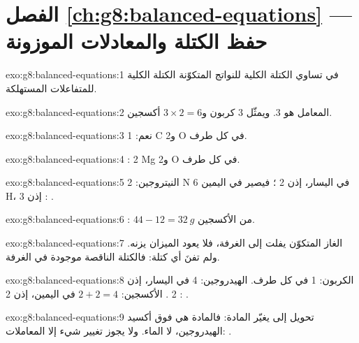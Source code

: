 \section*{الفصل \ref{ch:g8:balanced-equations} --- حفظ الكتلة والمعادلات الموزونة}

\begin{solution}{exo:g8:balanced-equations:1}
في  تساوي الكتلة الكلية للنواتج المتكوّنة الكتلة الكلية
للمتفاعلات المستهلكة.
\end{solution}

\begin{solution}{exo:g8:balanced-equations:2}
المعامل هو 3. ويمثّل 3  كربون و$3 \times 2 = 6$
 أكسجين.
\end{solution}

\begin{solution}{exo:g8:balanced-equations:3}
نعم: 1 C و2 O في كل طرف.
\end{solution}

\begin{solution}{exo:g8:balanced-equations:4}
: 2 Mg و2 O في كل طرف.
\end{solution}

\begin{solution}{exo:g8:balanced-equations:5}
النيتروجين: 2 N في اليسار، إذن 2 ؛ فيصير في اليمين 6 H، إذن 3
: .
\end{solution}

\begin{solution}{exo:g8:balanced-equations:6}
: $44 - 12 = \qty{32}{g}$ من الأكسجين.
\end{solution}

\begin{solution}{exo:g8:balanced-equations:7}
الغاز المتكوّن يفلت إلى الغرفة، فلا يعود الميزان يزنه. ولم تفنَ أي كتلة:
فالكتلة الناقصة موجودة في  الغرفة.
\end{solution}

\begin{solution}{exo:g8:balanced-equations:8}
الكربون: 1 في كل طرف. الهيدروجين: 4 في اليسار، إذن 2 . الأكسجين:
$2 + 2 = 4$ في اليمين، إذن 2 :
.
\end{solution}

\begin{solution}{exo:g8:balanced-equations:9}
تحويل  إلى  يغيّر المادة: فالمادة  هي فوق
أكسيد الهيدروجين، لا الماء. ولا يجوز تغيير شيء إلا المعاملات:
.
\end{solution}

